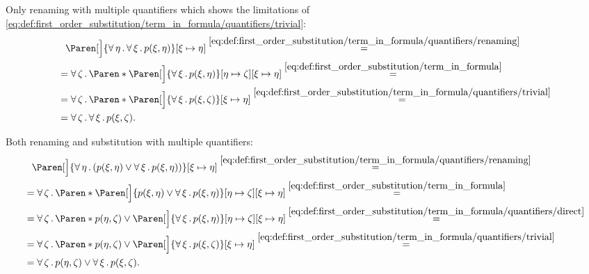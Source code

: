 \begin{example}
\begin{ExEnum}
     Only renaming with multiple quantifiers which shows the limitations of \eqref{eq:def:first_order_substitution/term_in_formula/quantifiers/trivial}:
    \begin{align*}
      &{}\phantom{=}{}
      \Paren[\Big]{\Qnt{\forall}{\eta} \Qnt{\forall}{\xi} p(\xi, \eta)}[\xi \mapsto \eta]
      \overset {\eqref{eq:def:first_order_substitution/term_in_formula/quantifiers/renaming}} = \\ &=
      \Qnt{\forall}{\zeta} \Paren*{ \Paren[\Big]{ \Qnt{\forall}{\xi} p(\xi, \eta) }[\eta \mapsto \zeta][\xi \mapsto \eta]}
      \overset {\eqref{eq:def:first_order_substitution/term_in_formula}} = \\ &=
      \Qnt{\forall}{\zeta} \Paren*{ \Paren[\Big]{ \Qnt{\forall}{\xi} p(\xi, \zeta) }[\xi \mapsto \eta]}
      \overset {\eqref{eq:def:first_order_substitution/term_in_formula/quantifiers/trivial}} = \\ &=
      \Qnt{\forall}{\zeta} \Qnt{\forall}{\xi} p(\xi, \zeta).
    \end{align*}

     Both renaming and substitution with multiple quantifiers:
    \begin{align*}
      &{}\phantom{=}{}
      \Paren[\Big]{ \Qnt{\forall}{\eta} (p(\xi, \eta) \vee \Qnt{\forall}{\xi} p(\xi, \eta)) }[\xi \mapsto \eta]
      \overset {\eqref{eq:def:first_order_substitution/term_in_formula/quantifiers/renaming}} = \\ &=
      \Qnt{\forall}{\zeta} \Paren*{ \Paren[\Big]{ p(\xi, \eta) \vee \Qnt{\forall}{\xi} p(\xi, \eta) }[\eta \mapsto \zeta][\xi \mapsto \eta] }
      \overset {\eqref{eq:def:first_order_substitution/term_in_formula}} = \\ &=
      \Qnt{\forall}{\zeta} \Paren*{ p(\eta, \zeta) \vee \Paren[\Big]{ \Qnt{\forall}{\xi} p(\xi, \eta) }[\eta \mapsto \zeta][\xi \mapsto \eta] }
      \overset {\eqref{eq:def:first_order_substitution/term_in_formula/quantifiers/direct}} = \\ &=
      \Qnt{\forall}{\zeta} \Paren*{ p(\eta, \zeta) \vee \Paren[\Big]{ \Qnt{\forall}{\xi} p(\xi, \zeta) }[\xi \mapsto \eta] }
      \overset {\eqref{eq:def:first_order_substitution/term_in_formula/quantifiers/trivial}} = \\ &=
      \Qnt{\forall}{\zeta} p(\eta, \zeta) \vee \Qnt{\forall}{\xi} p(\xi, \zeta).
    \end{align*}


\end{ExEnum}
\end{example}
